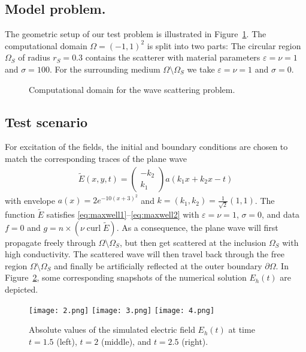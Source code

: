 \documentclass[12pt,reqno,a4paper]{amsart}
\theoremstyle{definition}
\def\curl{\operatorname{curl}}
\begin{document}
\subsection*{Model problem.}
The geometric setup of our test problem is illustrated in Figure~\ref{fig:2}. 
The computational domain $\Omega=(-1,1)^2$ is split into two parts: 
The circular region $\Omega_S$ of radius $r_S=0.3$ contains the scatterer with material parameters $\varepsilon=\nu=1$ and $\sigma=100$. 
For the surrounding medium $\Omega \setminus \Omega_S$ we take $\varepsilon=\nu=1$ and $\sigma=0$.
\begin{figure}[ht!]
\centering
{}
\caption{Computational domain for the wave scattering problem.\label{fig:2}}
\end{figure}

\subsection*{Test scenario}
For excitation of the fields, the initial and boundary conditions are chosen to match the corresponding traces of the plane wave 
\begin{align*}
\widetilde E(x,y,t)=
\begin{pmatrix}
-k_2 \\ k_1    
\end{pmatrix}
a(k_1x+k_2x-t)
\end{align*}
with envelope $a(x)=2e^{-10(x+3)^2}$ and $k=(k_1,k_2)=\frac1{\sqrt{2}}(1,1)$. 
The function $\widetilde E$ 
satisfies \eqref{eq:maxwell1}--\eqref{eq:maxwell2} with $\varepsilon=\nu=1$, $\sigma=0$, and data $f=0$ and $g=n \times (\nu \curl \widetilde E)$.
As a consequence, the plane wave will first propagate freely through $\Omega \setminus \Omega_S$, but then get scattered at the inclusion $\Omega_S$ with high conductivity. 
The scattered wave will then travel back through the free region $\Omega \setminus \Omega_S$ and finally be artificially reflected at the outer boundary $\partial\Omega$.
In Figure~\ref{fig:wave}, some corresponding snapshots of the numerical solution $E_h(t)$ are depicted. 
\begin{figure}[ht!]
    \centering
    \texttt{[image: 2.png]}\quad
    \texttt{[image: 3.png]}\quad
    \texttt{[image: 4.png]}
    \caption{Absolute values of the simulated electric field $E_h(t)$ at time $t=1.5$ (left), $t=2$ (middle), and $t=2.5$ (right).}
    \label{fig:wave}
\end{figure}
\end{document}

